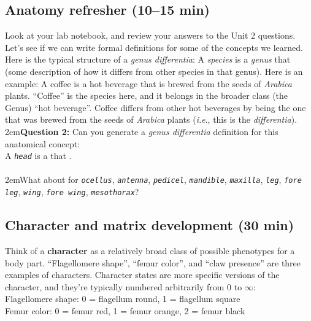 \documentclass[letterpaper, 11pt]{article}
\newcommand{\latinword}[1]{\texttt{\itshape #1}}%
\begin{document}
\subsection{Anatomy refresher (10--15 min)}
Look at your lab notebook, and review your answers to the Unit 2 questions. Let's see if we can write formal  definitions for some of the concepts we learned. Here is the typical structure of a \textit{genus differentia}: A \textit{species} is a \textit{genus} that (some description of how it differs from other species in that genus). Here is an example: A coffee is a hot beverage that is brewed from the seeds of \textit{Arabica} plants. ``Coffee'' is the species here, and it belongs in the broader class (the Genus) ``hot beverage''. Coffee differs from other hot beverages by being the one that was brewed from the seeds of \textit{Arabica} plants (\textit{i.e}., this is the \textit{differentia}).\\

\hangindent2em\textbf{Question 2:} Can you generate a \textit{genus differentia} definition for this anatomical concept: \\

A \latinword{head} is a \makebox[30 mm]{\hrulefill} that \hrulefill.\\ \\

\hangindent2em{}What about for \latinword{ocellus}, \latinword{antenna}, \latinword{pedicel}, \latinword{mandible}, \latinword{maxilla}, \latinword{leg}, \latinword{fore leg}, \latinword{wing}, \latinword{fore wing}, \latinword{mesothorax}? \\

\subsection{Character and matrix development (30 min)}
Think of a \textbf{character} as a relatively broad class of possible phenotypes for a body part. ``Flagellomere shape'', ``femur color'', and ``claw presence'' are three examples of characters. Character states are more specific versions of the character, and they're typically numbered arbitrarily from 0 to $\infty$:\\

Flagellomere shape:	0 = flagellum round, 1 = flagellum square\\

Femur color: 0 = femur red, 1 = femur orange, 2 = femur black\\
\end{document}
